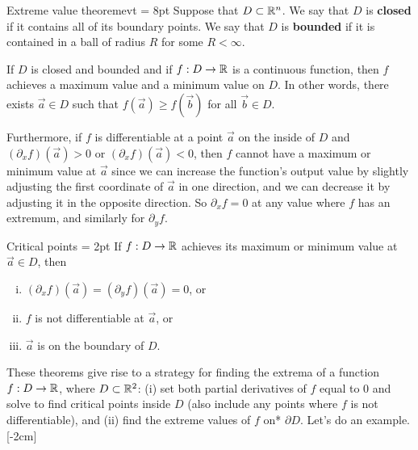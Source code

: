 \documentclass{watsonbook}
\begin{document}
\begin{theo}{Extreme value theorem}{evt} \parskip = 8pt 
  Suppose that $D \subset \mathbb{R}^n$. We say that $D$ is \textbf{closed}
  if it contains all of its boundary points. We say that $D$ is
  \textbf{bounded} if it is contained in a ball of radius $R$ for
  some $R<\infty$.

  If $D$ is closed and bounded and if $f:D \to \mathbb{R}$ is a continuous
  function, then $f$ achieves a maximum value and a minimum value on
  $D$. In other words, there exists $\vec{a} \in D$ such that
  $f(\vec{a}) \geq f(\vec{b})$ for all $\vec{b} \in D$. 
\end{theo}

Furthermore, if $f$ is differentiable at a point $\vec{a}$ on the
inside of $D$ and $(\partial_x f)(\vec{a}) >0$ or
$(\partial_x f)(\vec{a}) <0$, then $f$ cannot have a maximum or
minimum value at $\vec{a}$ since we can increase the function's
output value by slightly adjusting the first coordinate of
$\vec{a}$ in one direction, and we can decrease it by adjusting
it in the opposite direction. So $\partial_x f = 0$ at any value
where $f$ has an extremum, and similarly for $\partial _y f$. 

\begin{theo}{Critical points}{} \parskip = 2pt
  If $f:D \to \mathbb{R}$ achieves its maximum or minimum value at
  $\vec{a} \in D$, then
  \begin{enumerate}[(i),itemsep=4pt]
  \item $(\partial_x f)(\vec{a})= (\partial_yf)(\vec{a}) =
    0$, or 
  \item $f$ is not differentiable at $\vec{a}$, or
  \item $\vec{a}$ is on the boundary of $D$. 
  \end{enumerate}
\end{theo}

These theorems give rise to a strategy for finding the extrema of a
function $f:D \to \mathbb{R}$, where $D \subset \mathbb{R}^2$: (i) set both partial
derivatives of $f$ equal to 0 and solve to find critical points
inside $D$ (also include any points where $f$ is not
differentiable), and (ii) find the extreme values of $f$ on*
$\partial D$. Let's do an example. [-2cm]
\end{document}
